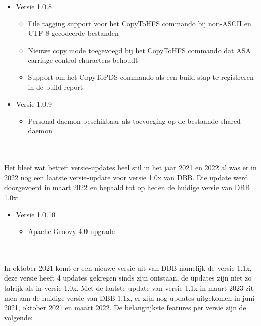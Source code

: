 \begin{itemize}
    \item Versie 1.0.8
    \begin{itemize}
        \item File tagging support voor het CopyToHFS commando bij non-ASCII en UTF-8 gecodeerde bestanden
        \item Nieuwe copy mode toegevoegd bij het CopyToHFS commando dat ASA carriage control characters behoudt
        \item Support om het CopyToPDS commando als een build stap te registreren in de build report
    \end{itemize}
    \item Versie 1.0.9
    \begin{itemize}
        \item Personal daemon beschikbaar als toevoeging op de bestaande shared daemon
    \end{itemize}
\end{itemize}
\\ \\
Het bleef wat betreft versie-updates heel stil in het jaar 2021 en 2022 al was er in 2022 nog een laatste versie-update voor versie 1.0x van DBB. Die update werd doorgevoerd in maart 2022 en bepaald tot op heden de huidige versie van DBB 1.0x:
\begin{itemize}
    \item Versie 1.0.10
    \begin{itemize}
        \item Apache Groovy 4.0 upgrade
    \end{itemize}
\end{itemize}
\autocite{IBM2022}
\\ \\
In oktober 2021 komt er een nieuwe versie uit van DBB namelijk de versie 1.1x, deze versie heeft 4 updates gekregen sinds zijn ontstaan, de updates zijn niet zo talrijk als in versie 1.0x. Met de laatste update van versie 1.1x in maart 2023 zit men aan de huidige versie van DBB 1.1x, er zijn nog updates uitgekomen in juni 2021, oktober 2021 en maart 2022. De belangrijkste features per versie zijn de volgende:

